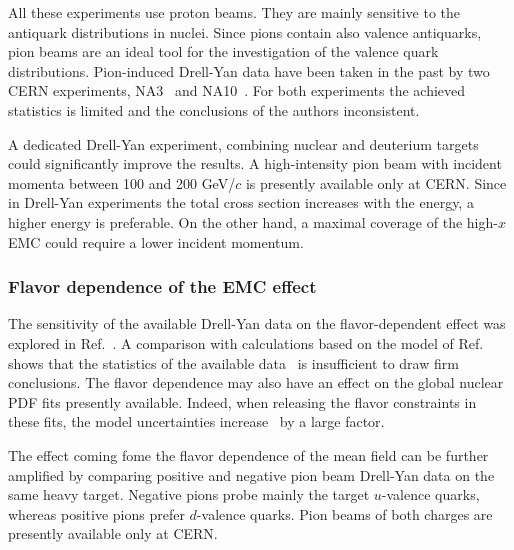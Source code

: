 All these experiments use proton beams. They are mainly sensitive to the antiquark 
distributions in nuclei.  Since pions contain also valence antiquarks, pion beams are  
an ideal tool for the investigation of the valence quark distributions. Pion-induced Drell-Yan data have 
been taken in the past by two CERN experiments, NA3~\cite{Badier:1981ci} 
and NA10~\cite{Bordalo:1987cs}.  For both experiments the achieved statistics is limited
and the conclusions of the authors inconsistent.  

A dedicated Drell-Yan experiment, 
combining nuclear and deuterium targets could significantly improve the results. 
A high-intensity pion beam with incident momenta between 100 and 200 GeV/$c$ is presently available 
only at CERN. Since in Drell-Yan experiments the total cross section increases with the energy, a higher 
energy is preferable. On the other hand, a maximal coverage of the high-$x$ EMC could require a 
lower incident momentum.  

\subsubsection{Flavor dependence of the EMC effect} 

The sensitivity of the available Drell-Yan data on the flavor-dependent effect was explored in 
Ref.~\cite{Dutta:2010pg}. A comparison with calculations based on the model of Ref.~\cite{Cloet:2009qs} 
shows that the  statistics of the available data~\cite{Badier:1981ci,Bordalo:1987cs} is insufficient to draw firm conclusions. 
The flavor dependence may also have an effect 
on the global nuclear PDF fits presently available. Indeed, when releasing the flavor constraints in these fits, 
the model uncertainties increase~\cite{Paakinen:2017} by a large factor. 

The effect coming fome the flavor dependence of the mean field can be further amplified by 
comparing positive and negative pion beam Drell-Yan data on the same heavy target. Negative pions probe mainly the 
target $u$-valence quarks, whereas positive pions prefer $d$-valence quarks. Pion beams of both charges
are presently available only at CERN. 

